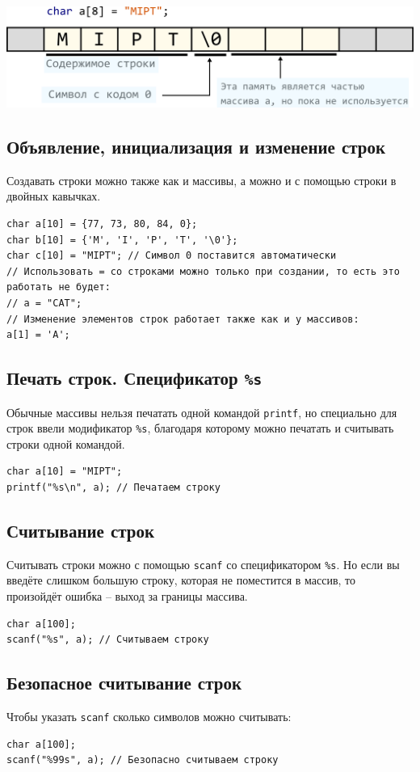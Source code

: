 \documentclass{article}
\begin{document}
\begin{center}
\includegraphics[scale=0.75]{../images/string_in_memory.png}
\end{center}

\subsection*{Объявление, инициализация и изменение строк}
Создавать строки можно также как и массивы, а можно и с помощью строки в двойных кавычках.
\begin{lstlisting}
char a[10] = {77, 73, 80, 84, 0};
char b[10] = {'M', 'I', 'P', 'T', '\0'};
char c[10] = "MIPT"; // Символ 0 поставится автоматически
// Использовать = со строками можно только при создании, то есть это работать не будет:
// a = "CAT";
// Изменение элементов строк работает также как и у массивов:
a[1] = 'A';
\end{lstlisting}

\subsection*{Печать строк. Спецификатор \texttt{\%s}}
Обычные массивы нельзя печатать одной командой \texttt{printf}, но специально для строк ввели модификатор \texttt{\%s}, благодаря которому можно печатать и считывать строки одной командой.
\begin{lstlisting}
char a[10] = "MIPT";
printf("%s\n", a); // Печатаем строку
\end{lstlisting}


\subsection*{Считывание строк}
Считывать строки можно с помощью \texttt{scanf} со спецификатором \texttt{\%s}. Но если вы введёте слишком большую строку,
которая не поместится в массив, то произойдёт ошибка -- выход за границы массива.
\begin{lstlisting}
char a[100];
scanf("%s", a); // Считываем строку
\end{lstlisting}

\subsection*{Безопасное считывание строк}
Чтобы указать \texttt{scanf} сколько символов можно считывать:
\begin{lstlisting}
char a[100];
scanf("%99s", a); // Безопасно считываем строку
\end{lstlisting}
\end{document}
